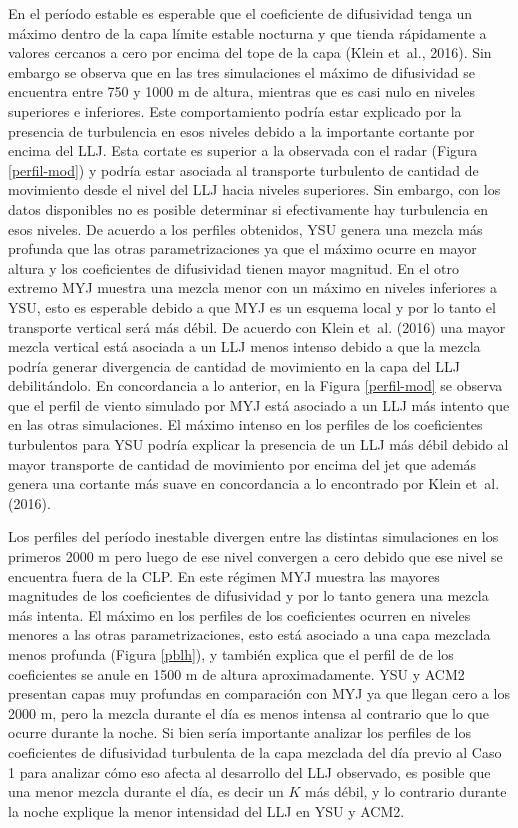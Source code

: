 \documentclass[12pt,spanish,oneside, a4paper]{book}
\begin{document}
En el período estable es esperable que el coeficiente de difusividad
tenga un máximo dentro de la capa límite estable nocturna y que tienda
rápidamente a valores cercanos a cero por encima del tope de la capa
(Klein et~al., 2016). Sin embargo se observa que en las tres
simulaciones el máximo de difusividad se encuentra entre 750 y 1000 m de
altura, mientras que es casi nulo en niveles superiores e inferiores.
Este comportamiento podría estar explicado por la presencia de
turbulencia en esos niveles debido a la importante cortante por encima
del LLJ. Esta cortate es superior a la observada con el radar (Figura
\ref{perfil-mod}) y podría estar asociada al transporte turbulento de
cantidad de movimiento desde el nivel del LLJ hacia niveles superiores.
Sin embargo, con los datos disponibles no es posible determinar si
efectivamente hay turbulencia en esos niveles. De acuerdo a los perfiles
obtenidos, YSU genera una mezcla más profunda que las otras
parametrizaciones ya que el máximo ocurre en mayor altura y los
coeficientes de difusividad tienen mayor magnitud. En el otro extremo
MYJ muestra una mezcla menor con un máximo en niveles inferiores a YSU,
esto es esperable debido a que MYJ es un esquema local y por lo tanto el
transporte vertical será más débil. De acuerdo con Klein et~al. (2016)
una mayor mezcla vertical está asociada a un LLJ menos intenso debido a
que la mezcla podría generar divergencia de cantidad de movimiento en la
capa del LLJ debilitándolo. En concordancia a lo anterior, en la Figura
\ref{perfil-mod} se observa que el perfil de viento simulado por MYJ
está asociado a un LLJ más intento que en las otras simulaciones. El
máximo intenso en los perfiles de los coeficientes turbulentos para YSU
podría explicar la presencia de un LLJ más débil debido al mayor
transporte de cantidad de movimiento por encima del jet que además
genera una cortante más suave en concordancia a lo encontrado por Klein
et~al. (2016).

Los perfiles del período inestable divergen entre las distintas
simulaciones en los primeros 2000 m pero luego de ese nivel convergen a
cero debido que ese nivel se encuentra fuera de la CLP. En este régimen
MYJ muestra las mayores magnitudes de los coeficientes de difusividad y
por lo tanto genera una mezcla más intenta. El máximo en los perfiles de
los coeficientes ocurren en niveles menores a las otras
parametrizaciones, esto está asociado a una capa mezclada menos profunda
(Figura \ref{pblh}), y también explica que el perfil de de los
coeficientes se anule en 1500 m de altura aproximadamente. YSU y ACM2
presentan capas muy profundas en comparación con MYJ ya que llegan cero
a los 2000 m, pero la mezcla durante el día es menos intensa al
contrario que lo que ocurre durante la noche. Si bien sería importante
analizar los perfiles de los coeficientes de difusividad turbulenta de
la capa mezclada del día previo al Caso 1 para analizar cómo eso afecta
al desarrollo del LLJ observado, es posible que una menor mezcla durante
el día, es decir un \(K\) más débil, y lo contrario durante la noche
explique la menor intensidad del LLJ en YSU y ACM2.
\end{document}
